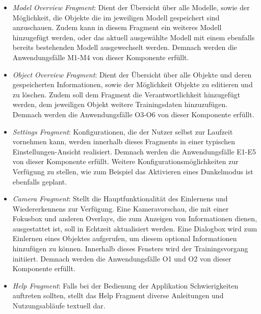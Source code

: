 \documentclass[oneside]{ausarbeitung}
\begin{document}
\begin{itemize}
	\item \textit{Model Overview Fragment}: Dient der Übersicht über alle Modelle, sowie der Möglichkeit, die Objekte die im jeweiligen Modell gespeichert sind anzuschauen. Zudem kann in diesem Fragment ein weiteres Modell hinzugefügt werden, oder das aktuell ausgewählte Modell mit einem ebenfalls bereits bestehenden Modell ausgewechselt werden. Demnach werden die Anwendungsfälle M1-M4 von dieser Komponente erfüllt.

	\item \textit{Object Overview Fragment}: Dient der Übersicht über alle Objekte und deren gespeicherten Informationen, sowie der Möglichkeit Objekte zu editieren und zu löschen. Zudem soll dem Fragment die Verantwortlichkeit hinzugefügt werden, dem jeweiligen Objekt weitere Trainingsdaten hinzuzufügen. Demnach werden die Anwendungsfälle O3-O6 von dieser Komponente erfüllt.
	
	\item \textit{Settings Fragment}: Konfigurationen, die der Nutzer selbst zur Laufzeit vornehmen kann, werden innerhalb dieses Fragments in einer typischen Einstellungen-Ansicht realisiert. Demnach werden die Anwendungsfälle E1-E5 von dieser Komponente erfüllt. Weitere Konfigurationsmöglichkeiten zur Verfügung zu stellen, wie zum Beispiel das Aktivieren eines Dunkelmodus ist ebenfalls geplant.
	
	\item \textit{Camera Fragment}: Stellt die Hauptfunktionalität des Einlernens und Wiedererkennens zur Verfügung. Eine Kameravorschau, die mit einer Fokusbox und anderen Overlays, die zum Anzeigen von Informationen dienen, ausgestattet ist, soll in Echtzeit aktualisiert werden. Eine Dialogbox wird zum Einlernen eines Objektes aufgerufen, um diesem optional Informationen hinzufügen zu können. Innerhalb dieses Fensters wird der Trainingsvorgang initiiert. Demnach werden die Anwendungsfälle O1 und O2 von dieser Komponente erfüllt.
	
	\item \textit{Help Fragment}: Falls bei der Bedienung der Applikation Schwierigkeiten auftreten sollten, stellt das Help Fragment diverse Anleitungen und Nutzungsabläufe textuell dar.

\end{itemize}
\end{document}
